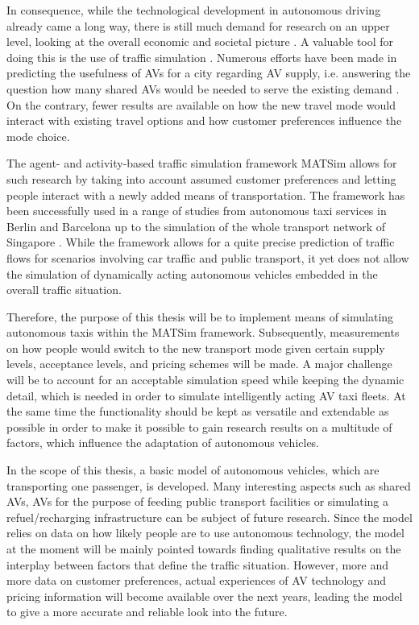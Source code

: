 In consequence, while the technological development in autonomous driving already
came a long way, there is still much demand for research on an upper level, looking
at the overall economic and societal picture \citep{Silberg2013, SchoettleBrandon2014}. A valuable tool for doing this is the
use of traffic simulation \citep{Fagnant2014, ITF2014}. Numerous efforts have been
made in predicting the usefulness of AVs for a city regarding AV supply, i.e.
answering the question how many shared AVs would be needed to serve the
existing demand \citep{Bosch2015}. On the contrary, fewer results are available on how the new travel
mode would interact with existing travel options and how customer preferences
influence the mode choice.

The agent- and activity-based traffic simulation framework MATSim \citep{Horni2015} allows for such
research \citep{Boesch2015} by taking into account assumed customer preferences and letting people
interact with a newly added means of transportation.
The framework has been successfully used in a range of studies from autonomous taxi services
in Berlin and Barcelona \citep{Bischoff2016} up to the simulation of the whole transport network of
Singapore \citep{Erath2014}. While the framework allows for a quite precise prediction of traffic
flows for scenarios involving car traffic and public transport, it yet does not
allow the simulation of dynamically acting autonomous vehicles embedded in the
overall traffic situation.

Therefore, the purpose of this thesis will be to implement means of simulating autonomous
taxis within the MATSim framework. Subsequently, measurements on how people would
switch to the new transport mode given certain supply levels, acceptance levels, and
pricing schemes will be made. A major challenge will be to account for an acceptable simulation
speed while keeping the dynamic detail, which is needed in order to simulate
intelligently acting AV taxi fleets. At the same time the functionality should be kept
as versatile and extendable as possible in order to make it possible to gain research
results on a multitude of factors, which influence the adaptation of autonomous
vehicles.

In the scope of this thesis, a basic model of autonomous vehicles, which are transporting one passenger, is developed. Many
interesting aspects such as shared AVs, AVs for the purpose of feeding
public transport facilities or simulating a refuel/recharging infrastructure can
be subject of future research. Since the model relies on data on how likely
people are to use autonomous technology, the model at the moment will be mainly
pointed towards finding qualitative results on the interplay between factors that
define the traffic situation. However, more and more data on customer preferences, actual experiences of AV technology and pricing information will
become available over the next years, leading the model to give a more accurate
and reliable look into the future.

